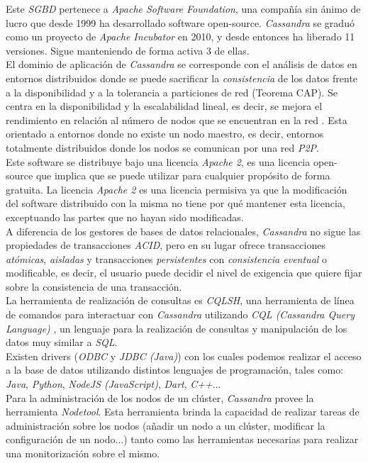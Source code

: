 \documentclass[3pt]{article}
\begin{document}
Este \emph{SGBD} pertenece a \emph{Apache Software Foundation}, una compañía sin ánimo de lucro que desde 1999 ha desarrollado software open-source. \emph{Cassandra} se graduó como un proyecto de \emph{Apache Incubator} en 2010, y desde entonces ha liberado 11 versiones. Sigue manteniendo de forma activa 3 de ellas. \cite{AP:5} \\
El dominio de aplicación de \emph{Cassandra} se corresponde con el análisis de datos en entornos distribuidos donde se puede sacrificar la \emph{consistencia} de los datos frente a la disponibilidad y a la tolerancia a particiones de red (Teorema CAP). Se centra en la disponibilidad y la escalabilidad lineal, es decir, se mejora el rendimiento en relación al número de nodos que se encuentran en la red \cite{WIKI:5}. Esta orientado a entornos donde no existe un nodo maestro, es decir, entornos totalmente distribuidos donde los nodos se comunican por una red \emph{P2P}.\\

Este software se distribuye bajo una licencia \emph{Apache 2}, es una licencia open-source que implica que se puede utilizar para cualquier propósito de forma gratuita. La licencia \emph{Apache 2} es una licencia permisiva ya que la modificación del software distribuido con la misma no tiene por qué mantener esta licencia, exceptuando las partes que no hayan sido modificadas. \cite{WIKI:6}\\
A diferencia de los gestores de bases de datos relacionales, \emph{Cassandra} no sigue las propiedades de transacciones \emph{ACID}, pero en su lugar ofrece transacciones \emph{atómicas}, \emph{aisladas} y transacciones \emph{persistentes} con \emph{consistencia eventual} o modificable, es decir, el usuario puede decidir el nivel de exigencia que quiere fijar sobre la consistencia de una transacción. \cite{DS:1} \\
La herramienta de realización de consultas es \emph{CQLSH}, una herramienta de línea de comandos para interactuar con \emph{Cassandra} utilizando \emph{CQL (Cassandra Query Language)} \cite{AP:3}, un lenguaje para la realización de consultas y manipulación de los datos muy similar a \emph{SQL}. \cite{WIKI:5} \\
Existen drivers (\emph{ODBC} y \emph{JDBC (Java)}) con los cuales podemos realizar el acceso a la base de datos utilizando distintos lenguajes de programación, tales como: \emph{Java}, \emph{Python}, \emph{NodeJS (JavaScript)}, \emph{Dart}, \emph{C++}... \cite{AP:4} \\
Para la administración de los nodos de un clúster, \emph{Cassandra} provee la herramienta \emph{Nodetool}. Esta herramienta brinda la capacidad de realizar tareas de administración sobre los nodos (añadir un nodo a un clúster, modificar la configuración de un nodo...) tanto como las herramientas necesarias para realizar una monitorización sobre el mismo. \cite{WIKI:5} \\
\end{document}
